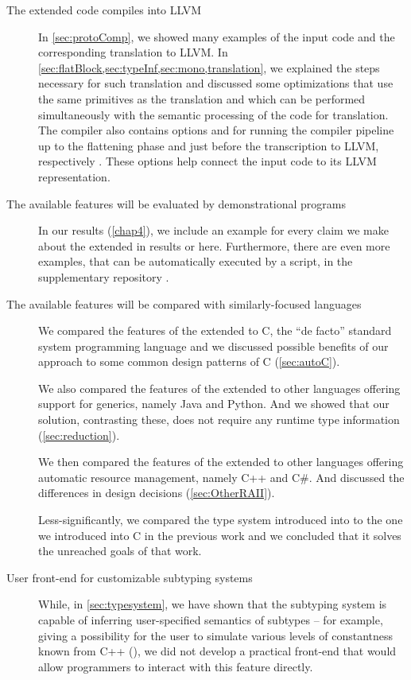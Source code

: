 \begin{description}
    \item[The extended \cmm  code compiles into LLVM] In \cref{sec:protoComp}, we showed many examples of the input code and the corresponding translation to LLVM. In \cref{sec:flatBlock,sec:typeInf,sec:mono,translation}, we explained the steps necessary for such translation and discussed some optimizations that use the same primitives as the translation and which can be performed simultaneously with the semantic processing of the code for translation. The compiler also contains options  and  for running the compiler pipeline up to the flattening phase and just before the transcription to LLVM, respectively \cite{klepl2022compiler}. These options help connect the input code to its LLVM representation.

    \item[The available features will be evaluated by demonstrational programs] In our results (\cref{chap4}), we include an example for every claim we make about the extended \cmm in results or here. Furthermore, there are even more examples, that can be automatically executed by a script, in the supplementary repository \cite{klepl2022compiler}.

    \item[The available features will be compared with similarly-focused languages] We compared the features of the extended \cmm to C, the ``de facto'' standard system programming language and we discussed possible benefits of our approach to some common design patterns of C (\cref{sec:autoC}).

    We also compared the features of the extended \cmm to other languages offering support for generics, namely Java and Python. And we showed that our solution, contrasting these, does not require any runtime type information (\cref{sec:reduction}).

    We then compared the features of the extended \cmm to other languages offering automatic resource management, namely C++ and C\#. And discussed the differences in design decisions (\cref{sec:OtherRAII}).

    Less-significantly, we compared the type system introduced into \cmm to the one we introduced into C in the previous work and we concluded that it solves the unreached goals of that work.

    \item[User front-end for customizable subtyping systems] While, in \cref{sec:typesystem}, we have shown that the subtyping system is capable of inferring user-specified semantics of subtypes -- for example, giving a possibility for the user to simulate various levels of constantness known from C++ (), we did not develop a practical front-end that would allow programmers to interact with this feature directly.
\end{description}

